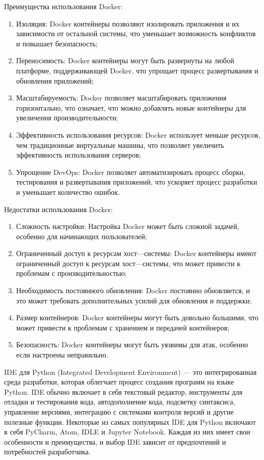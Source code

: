     Преимущества использования Docker:
    \begin{enumerate}
        \item Изоляция: Docker контейнеры позволяют изолировать приложения и их зависимости от остальной системы, что уменьшает возможность конфликтов и повышает безопасность;
        \item Переносимость: Docker контейнеры могут быть развернуты на любой платформе, поддерживающей Docker, что упрощает процесс развертывания и обновления приложений;
        \item Масштабируемость: Docker позволяет масштабировать приложения горизонтально, что означает, что можно добавлять новые контейнеры для увеличения производительности;
        \item Эффективность использования ресурсов: Docker использует меньше ресурсов, чем традиционные виртуальные машины, что позволяет увеличить эффективность использования серверов;
        \item Упрощение DevOps: Docker позволяет автоматизировать процесс сборки, тестирования и развертывания приложений, что ускоряет процесс разработки и уменьшает количество ошибок.
    \end{enumerate}

    Недостатки использования Docker:
    \begin{enumerate}
        \item Сложность настройки: Настройка Docker может быть сложной задачей, особенно для начинающих пользователей;
        \item Ограниченный доступ к ресурсам хост—системы: Docker контейнеры имеют ограниченный доступ к ресурсам хост—системы, что может привести к проблемам с производительностью;
        \item Необходимость постоянного обновления: Docker постоянно обновляется, и это может требовать дополнительных усилий для обновления и поддержки;
        \item Размер контейнеров: Docker контейнеры могут быть довольно большими, что может привести к проблемам с хранением и передачей контейнеров;
        \item Безопасность: Docker контейнеры могут быть уязвимы для атак, особенно если настроены неправильно.
    \end{enumerate}

    IDE для Python (Integrated Development Environment) — это интегрированная среда разработки, которая облегчает процесс создания программ на языке Python. IDE обычно включает в себя текстовый редактор, инструменты для отладки и тестирования кода, автодополнение кода, подсветку синтаксиса, управление версиями, интеграцию с системами контроля версий и другие полезные функции. Некоторые из самых популярных IDE для Python включают в себя PyCharm, Atom, IDLE и Jupyter Notebook. Каждая из них имеет свои особенности и преимущества, и выбор IDE зависит от предпочтений и потребностей разработчика.

